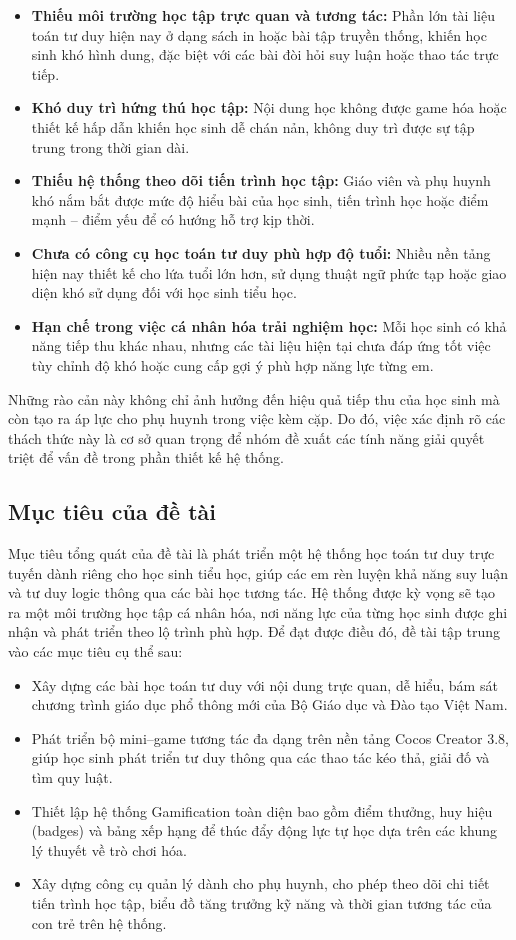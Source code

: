 \begin{itemize} \item \textbf{Thiếu môi trường học tập trực quan và tương tác:} Phần lớn tài liệu toán tư duy hiện nay ở dạng sách in hoặc bài tập truyền thống, khiến học sinh khó hình dung, đặc biệt với các bài đòi hỏi suy luận hoặc thao tác trực tiếp. \item \textbf{Khó duy trì hứng thú học tập:} Nội dung học không được game hóa hoặc thiết kế hấp dẫn khiến học sinh dễ chán nản, không duy trì được sự tập trung trong thời gian dài. \item \textbf{Thiếu hệ thống theo dõi tiến trình học tập:} Giáo viên và phụ huynh khó nắm bắt được mức độ hiểu bài của học sinh, tiến trình học hoặc điểm mạnh – điểm yếu để có hướng hỗ trợ kịp thời. \item \textbf{Chưa có công cụ học toán tư duy phù hợp độ tuổi:} Nhiều nền tảng hiện nay thiết kế cho lứa tuổi lớn hơn, sử dụng thuật ngữ phức tạp hoặc giao diện khó sử dụng đối với học sinh tiểu học. \item \textbf{Hạn chế trong việc cá nhân hóa trải nghiệm học:} Mỗi học sinh có khả năng tiếp thu khác nhau, nhưng các tài liệu hiện tại chưa đáp ứng tốt việc tùy chỉnh độ khó hoặc cung cấp gợi ý phù hợp năng lực từng em. \end{itemize}

Những rào cản này không chỉ ảnh hưởng đến hiệu quả tiếp thu của học sinh mà còn tạo ra áp lực cho phụ huynh trong việc kèm cặp. Do đó, việc xác định rõ các thách thức này là cơ sở quan trọng để nhóm đề xuất các tính năng giải quyết triệt để vấn đề trong phần thiết kế hệ thống.

\subsection{Mục tiêu của đề tài}

Mục tiêu tổng quát của đề tài là phát triển một hệ thống học toán tư duy trực tuyến dành riêng cho học sinh tiểu học, giúp các em rèn luyện khả năng suy luận và tư duy logic thông qua các bài học tương tác. Hệ thống được kỳ vọng sẽ tạo ra một môi trường học tập cá nhân hóa, nơi năng lực của từng học sinh được ghi nhận và phát triển theo lộ trình phù hợp. Để đạt được điều đó, đề tài tập trung vào các mục tiêu cụ thể sau:

\begin{itemize} \item Xây dựng các bài học toán tư duy với nội dung trực quan, dễ hiểu, bám sát chương trình giáo dục phổ thông mới của Bộ Giáo dục và Đào tạo Việt Nam. \item Phát triển bộ mini–game tương tác đa dạng trên nền tảng Cocos Creator 3.8, giúp học sinh phát triển tư duy thông qua các thao tác kéo thả, giải đố và tìm quy luật. \item Thiết lập hệ thống Gamification toàn diện bao gồm điểm thưởng, huy hiệu (badges) và bảng xếp hạng để thúc đẩy động lực tự học dựa trên các khung lý thuyết về trò chơi hóa. \item Xây dựng công cụ quản lý dành cho phụ huynh, cho phép theo dõi chi tiết tiến trình học tập, biểu đồ tăng trưởng kỹ năng và thời gian tương tác của con trẻ trên hệ thống. \end{itemize}

